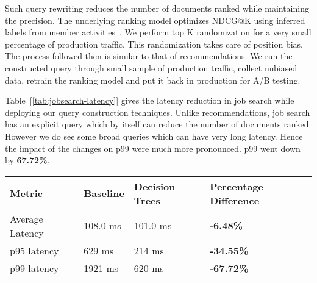 
Such query rewriting reduces the number of documents ranked while maintaining
the precision. The underlying ranking model optimizes NDCG@K using inferred
labels from member activities~\cite{liget}. We perform top K randomization for
a very small percentage of production traffic. This randomization takes care of
position bias. The process followed then is similar to that of recommendations.
We run the constructed query through small sample of production traffic,
collect unbiased data, retrain the ranking model and put it back in production
for A/B testing.


Table~[\ref{tab:jobsearch-latency}] gives the latency reduction in job search
while deploying our query construction techniques. Unlike recommendations, 
job search has an explicit query which by itself can reduce the number of documents ranked.
However we do see some broad queries which can have very long latency. 
Hence the impact of the changes on p99 were much more pronounced. p99 went down
by {\bf 67.72\%}. 

\begin{table*}
\centering
\caption{Impact of Query Construction on Job Search Latency}
\begin{tabular}{|l|l|l|l|} \hline
Metric&Baseline&Decision Trees&Percentage Difference \\ \hline
Average Latency& 108.0 ms& 101.0  ms& \bf{-6.48\%} \\ \hline
p95 latency& 629 ms& 214  ms& \bf{-34.55\%} \\ \hline
p99 latency& 1921 ms&620  ms& \bf{-67.72\%} \\ \hline
\end{tabular}
\label{tab:jobsearch-latency}
\end{table*}
